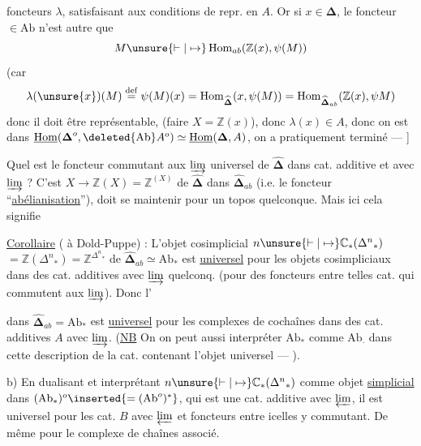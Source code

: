 foncteurs $\lambda$, satisfaisant aux conditions de
repr.  en $A$. Or si $x\in\boldsymbol\Delta$, le foncteur 
$\in\mathrm{Ab}$ n'est autre que
\[
M\unsure{\vdash|\mapsto}\operatorname{Hom}_{ab}(\mathbb Z(x),\psi(M))
\]
(car
\[
\lambda(\unsure{x})(M)\overset{\mathrm{def}}=\psi(M)(x)
=\operatorname{Hom}_{\widehat{\boldsymbol\Delta}}(x,\psi(M))
=\operatorname{Hom}_{\widehat{\boldsymbol\Delta}_{ab}}(\mathbb Z(x),\psi M)
\]
donc il doit être représentable,  (faire $X
=\mathbb Z(x)$), donc $\lambda(x)\in A$, donc on est
dans $\underline{\operatorname{Hom}}(\boldsymbol\Delta^o,\deleted{\mathrm{Ab}}A^o)\simeq\underline{\operatorname{Hom}}(\boldsymbol\Delta,A)$,
on a pratiquement terminé --- ]

Quel est  le foncteur commutant aux
$\varinjlim$  universel de $\widehat{\boldsymbol\Delta}$ dans cat.
additive et avec $\varinjlim$ ? C'est
$X\longrightarrow\mathbb Z(X)=\mathbb Z^{(X)}$ de $\widehat{\boldsymbol\Delta}$ dans $\widehat{\boldsymbol\Delta}_{ab}$
(i.e. le foncteur ``\uline{abélianisation}''), 
doit se maintenir pour un topos quelconque.
Mais ici  cela signifie

\uline{Corollaire} ( à Dold-Puppe) :  L'objet
cosimplicial  $n\unsure{\vdash|\mapsto}\mathbb C_*({\Delta^n}_*)$
$=\mathbb Z({\Delta^n}_*)=\mathbb Z^{{\Delta^n}_*}$ de $\widehat{\boldsymbol\Delta}_{ab}\simeq\mathrm{Ab}_*$
est \uline{universel} pour les objets cosimpliciaux
dans des cat. additives avec
$\varinjlim$ quelconq. (pour des foncteurs entre
telles cat. qui commutent aux
$\varinjlim$). Donc l'

dans $\widehat{\boldsymbol\Delta}_{ab}=\mathrm{Ab}_*$ est \uline{universel} pour les
complexes de cochaînes dans des cat.
additives $A$ avec $\varinjlim$. \unsure{\&} (\uline{NB} On 
on peut aussi interpréter $\mathrm{Ab}_*$ comme $\mathrm{Ab}_\cdot$
dans cette description de la cat. contenant
l'objet universel --- ).

b) En dualisant et interprétant
$n\unsure{\vdash|\mapsto}\mathbb C_*({\Delta^n}_*)$ comme objet \uline{simplicial}
dans $(\mathrm{Ab}_*)^o\inserted{=(\mathrm{Ab}^o)^*}$, qui est une cat. additive
avec $\varprojlim$, il est universel pour les
cat. $B$ avec $\varprojlim$ et foncteurs entre
icelles y commutant. De même pour le
complexe de chaînes associé.

